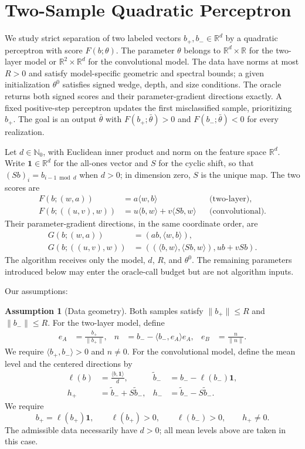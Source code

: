 \documentclass[10pt]{article}
\theoremstyle{definition}
\newtheorem{assumption}{Assumption}
\begin{document}
\section*{Two-Sample Quadratic Perceptron}
We study strict separation of two labeled vectors $b_+,b_-\in\mathbb{R}^d$ by a quadratic perceptron with score $F(b;\theta)$. The parameter $\theta$ belongs to $\mathbb{R}^d\times\mathbb{R}$ for the two-layer model or $\mathbb{R}^2\times\mathbb{R}^d$ for the convolutional model. The data have norms at most $R>0$ and satisfy model-specific geometric and spectral bounds; a given initialization $\theta^0$ satisfies signed wedge, depth, and size conditions. The oracle returns both signed scores and their parameter-gradient directions exactly. A fixed positive-step perceptron updates the first misclassified sample, prioritizing $b_+$. The goal is an output $\bar{\theta}$ with $F(b_+;\bar{\theta})>0$ and $F(b_-;\bar{\theta})<0$ for every realization.

Let $d\in\mathbb{N}_0$, with Euclidean inner product and norm on the feature space $\mathbb{R}^d$. Write $\mathbf{1}\in\mathbb{R}^d$ for the all-ones vector and $S$ for the cyclic shift, so that $(Sb)_i=b_{i-1\bmod d}$ when $d>0$; in dimension zero, $S$ is the unique map. The two scores are
\[
\begin{aligned}
F(b;(w,a))&=a\langle w,b\rangle
&&\text{(two-layer)},\\
F(b;((u,v),w))&=u\langle b,w\rangle+v\langle Sb,w\rangle
&&\text{(convolutional)}.
\end{aligned}
\]
Their parameter-gradient directions, in the same coordinate order, are
\[
\begin{aligned}
G(b;(w,a))&=(ab,\langle w,b\rangle),\\
G(b;((u,v),w))&=((\langle b,w\rangle,\langle Sb,w\rangle),ub+vSb).
\end{aligned}
\]
The algorithm receives only the model, $d$, $R$, and $\theta^0$. The remaining parameters introduced below may enter the oracle-call budget but are not algorithm inputs.

Our assumptions:
\begin{assumption}[Data geometry]
Both samples satisfy $\|b_+\|\leq R$ and $\|b_-\|\leq R$.
For the two-layer model, define
\[
\begin{aligned}
e_A&=\frac{b_+}{\|b_+\|},&
n&=b_--\langle b_-,e_A\rangle e_A,&
e_B&=\frac{n}{\|n\|}.
\end{aligned}
\]
We require $\langle b_+,b_-\rangle>0$ and $n\neq0$.
For the convolutional model, define the mean level and the centered directions by
\[
\begin{aligned}
\ell(b)&=\frac{\langle b,\mathbf{1}\rangle}{d},&
\widetilde b_-&=b_--\ell(b_-)\mathbf{1},\\
h_+&=\widetilde b_-+S\widetilde b_-,&
h_-&=\widetilde b_--S\widetilde b_-.
\end{aligned}
\]
We require
\[
b_+=\ell(b_+)\mathbf{1},\qquad
\ell(b_+)>0,\qquad \ell(b_-)>0,\qquad h_+\neq0.
\]
The admissible data necessarily have $d>0$; all mean levels above are taken in this case.
\end{assumption}
\end{document}
